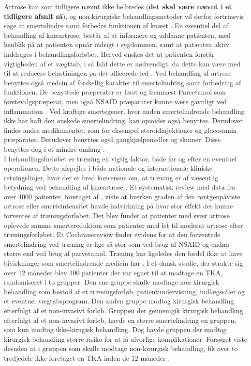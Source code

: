 Artrose kan som tidligere nævnt ikke helbredes (\textbf{det skal være nævnt i et tidligere afsnit så}), og non-kirurgiske behandlingsmetoder vil derfor fortrinsvis søge at smertelindre samt forbedre funktionen af knæet \citep{brostrom2012}. En essentiel del af behandling af knæartrose, består af at informere og uddanne patienten, med henblik på at patienten opnår indsigt i sygdommen, samt at patienten aktiv inddrages i behandlingsforløbet. Herved ønskes det at patienten forstår vigtigheden af et vægttab, i så fald dette er nødvendigt. da dette kan være med til at reducere belastiningen på det afficerede led \citep{brostrom2012}.
Ved behandling af artrose benyttes også medcin af forskellig karakter til smertelindring samt forbedring af funktionen. De benyttede præperater er først og fremmest Parcetamol som  førstevalgspræperat, men også NSAID præparater kunne være gavnligt ved inflammation \citep{schroder}. Ved kraftige smertegener, hvor anden smertelindrende behandling ikke har haft den ønskede smertelindring, kan opioider også benyttes. Derudover findes andre medikamenter, som for eksempel steroidinjektioner og glucosamin præparater. Derudover benyttes også ganghjælpemidler og skinner. Disse benyttes dog i et mindre omfang \citep{brostrom2012}.\\

I behandlingsforløbet er træning en vigtig faktor, både før og efter en eventuel operationen. Dette afspejles i både nationale og internationale kliniske retningslinjer, hvor der er bred konsensus om, at træning er af væsentlig betydning ved behandling af knæartrose \citep{brostrom2012}. Et systematisk review med data fra over 4000 patienter, foretaget af \cite{Syssorenskou}, viste at hverken graden af den røntgenpåviste artrose eller smerteintensitet havde indvirkning på hvor stor effekt der kunne forventes af træningsforløbet. Det blev fundet at patienter med svær artrose oplevede samme smertereduktion som patienter med let til moderat artrose efter træningsforløbet. Et Cochranereview finder evidens for at den forventede smertelindring ved træning er lige så stor som ved brug af NSAID og endnu større end ved brug af parvetamol. Træning har ligeledes den fordel ikke at have bivirkninger som smertelindrende medicin har \citep{sorenskou}.
I et dansk studie, der strakte sig over 12 måneder blev 100 patienter  der var egnet til at modtage en TKA, randomiseret i to grupper. Den ene gruppe skulle modtage non-kirurgisk behandling som bestod af et træningsforløb, patientundervisning, indlægssåler og et eventuel vægtabsprogram. Den anden gruppe modtog kirurgisk behandling efterfulgt af et non-invasivt forløb. Gruppen der gennemgik kirurgisk behandling efterfulgt af et non-invasivt forløb, havde en større smertelindring en gruppen, som kun modtog ikke-kirugisk behandling. Dog havde gruppen der modtog kirurgisk behandling større risiko for at få alvorlige komplikationer. Forsøget viste desuden at i gruppen som skulle modtage non-kirurgisk behandling, fik over to tredjedele ikke foretaget en TKA inden de 12 måneder \citep{newEngland}. 

